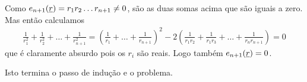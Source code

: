 \documentclass[repertorio-solutions-1.tex]{subfiles}
\renewcommand*{\u}[1]{\ensuremath{\uline{#1}}}
\begin{document}
\begin{solution}
Como $e_{n+1}(\u{r})=r_1r_2\dots r_{n+1}\neq 0$, são as duas
somas acima que são iguais a zero.
Mas então calculamos
\begin{align*}
\frac{1}{r_1^2}+\frac{1}{r_2^2}+\dots+\frac{1}{r_{n+1}^2}
=\left(\frac{1}{r_1}+\dots+\frac{1}{r_{n+1}}\right)^2
-2\left(\frac{1}{r_1r_2}+\frac{1}{r_1r_3}
+\dots+\frac{1}{r_nr_{n+1}}\right)=0
\end{align*}
que é claramente absurdo pois os $r_i$ são reais.
Logo também $e_{n+1}(\u{r})=0$.

Isto termina o passo de indução e o problema.
\end{solution}
\end{document}
